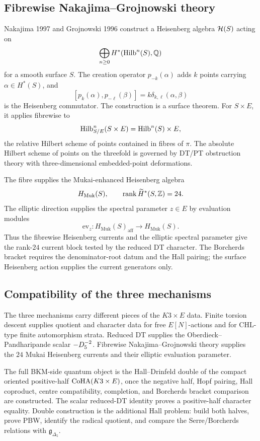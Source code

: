 \subsection*{Fibrewise Nakajima--Grojnowski theory}

Nakajima 1997 and Grojnowski 1996 construct a Heisenberg algebra
\(\mathcal H(S)\) acting on
\[
  \bigoplus_{n\geq0}H^{*}(\mathrm{Hilb}^{n}(S),\mathbb Q)
\]
for a smooth surface \(S\).  The creation operator \(p_{-k}(\alpha)\)
adds \(k\) points carrying \(\alpha\in H^{*}(S)\), and
\[
  [p_k(\alpha),p_{-\ell}(\beta)]
  =
  k\delta_{k,\ell}(\alpha,\beta)
\]
is the Heisenberg commutator.  The construction is a surface theorem.
For \(S\times E\), it applies fibrewise to
\[
  \mathrm{Hilb}^n_{S/E}(S\times E)=\mathrm{Hilb}^n(S)\times E,
\]
the relative Hilbert scheme of points contained in fibres of
\(\pi\).  The absolute Hilbert scheme of points on the threefold is
governed by DT/PT obstruction theory with three-dimensional
embedded-point deformations.

The fibre supplies the Mukai-enhanced Heisenberg algebra
\[
  H_{\mathrm{Muk}}(S),
  \qquad
  \operatorname{rank}\widetilde H^{*}(S,\mathbb Z)=24.
\]
The elliptic direction supplies the spectral parameter \(z\in E\) by
evaluation modules
\[
  \mathrm{ev}_{z}\colon
  H_{\mathrm{Muk}}(S)_{\mathrm{aff}}\to H_{\mathrm{Muk}}(S).
\]
Thus the fibrewise Heisenberg currents and the elliptic spectral
parameter give the rank-\(24\) current block tested by the reduced DT
character.  The Borcherds bracket requires the denominator-root datum and
the Hall pairing; the surface Heisenberg action supplies the current
generators only.

\subsection*{Compatibility of the three mechanisms}

The three mechanisms carry different pieces of the \(K3\times E\) data.
Finite torsion descent supplies quotient and character data for free
\(E[N]\)-actions and for CHL-type finite automorphism strata.
Reduced DT supplies the Oberdieck--Pandharipande scalar
\(-D_5^{-2}\).  Fibrewise Nakajima--Grojnowski theory supplies the
\(24\) Mukai Heisenberg currents and their elliptic evaluation
parameter.

The full BKM-side quantum object is the Hall--Drinfeld double of the
compact oriented positive-half
\(\mathrm{CoHA}(K3\times E)\), once the negative half, Hopf pairing, Hall
coproduct, centre compatibility, completion, and Borcherds bracket
comparison are constructed.  The scalar reduced-DT identity proves a
positive-half character equality.  Double construction is the additional
Hall problem: build both halves, prove PBW, identify the radical quotient,
and compare the Serre/Borcherds relations with
\(\mathfrak g_{\Delta_5}\).

